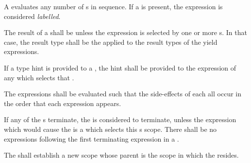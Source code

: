\specsubsubitem
A  evaluates any number of
s in sequence. If a  is present, the
expression is considered \textit{labelled}.

\specsubsubitem
The result of a  shall be 
unless the expression is selected by one or more
s. In that case, the result type shall be the
 applied to the result types of the
yield expressions.

\specsubsubitem
If a type hint is provided to a , the hint shall
be provided to the expression of any  which
selects that .

\specsubsubitem
The expressions shall be evaluated such that the side-effects of each all occur
in the order that each expression appears.

\specsubsubitem
If any of the s terminate, the
 is considered to terminate, unless the
expression which would cause the  is a
 which selects this
s scope. There shall be no expressions
following the first terminating expression in a .

\specsubsubitem
The  shall establish a new scope whose parent is
the scope in which the  resides.


\begin{grammar}
 \\
	  \\
	  \\
	  \\
	 \\

 \\
	 \\
	  \\
	  \\
	  \terminal{,}  \\
\end{grammar}

